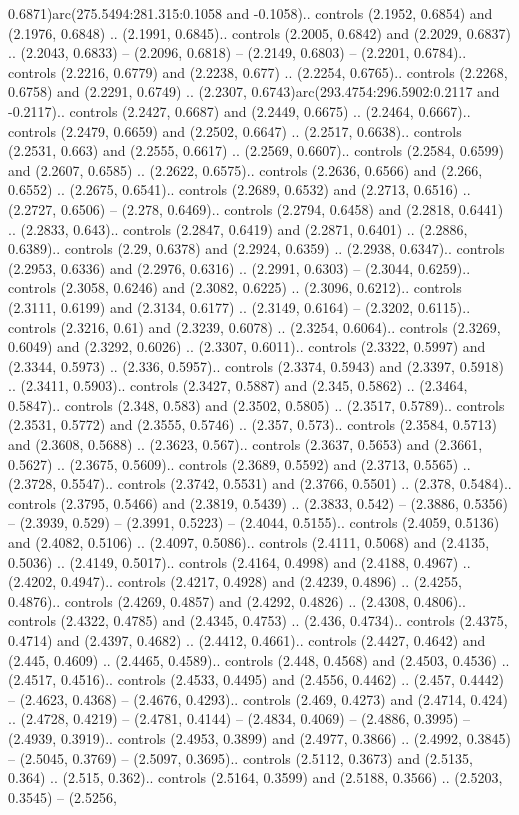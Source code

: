 0.6871)arc(275.5494:281.315:0.1058 and -0.1058).. controls (2.1952, 0.6854) and (2.1976, 0.6848) .. (2.1991, 0.6845).. controls (2.2005, 0.6842) and (2.2029, 0.6837) .. (2.2043, 0.6833) -- (2.2096, 0.6818) -- (2.2149, 0.6803) -- (2.2201, 0.6784).. controls (2.2216, 0.6779) and (2.2238, 0.677) .. (2.2254, 0.6765).. controls (2.2268, 0.6758) and (2.2291, 0.6749) .. (2.2307, 0.6743)arc(293.4754:296.5902:0.2117 and -0.2117).. controls (2.2427, 0.6687) and (2.2449, 0.6675) .. (2.2464, 0.6667).. controls (2.2479, 0.6659) and (2.2502, 0.6647) .. (2.2517, 0.6638).. controls (2.2531, 0.663) and (2.2555, 0.6617) .. (2.2569, 0.6607).. controls (2.2584, 0.6599) and (2.2607, 0.6585) .. (2.2622, 0.6575).. controls (2.2636, 0.6566) and (2.266, 0.6552) .. (2.2675, 0.6541).. controls (2.2689, 0.6532) and (2.2713, 0.6516) .. (2.2727, 0.6506) -- (2.278, 0.6469).. controls (2.2794, 0.6458) and (2.2818, 0.6441) .. (2.2833, 0.643).. controls (2.2847, 0.6419) and (2.2871, 0.6401) .. (2.2886, 0.6389).. controls (2.29, 0.6378) and (2.2924, 0.6359) .. (2.2938, 0.6347).. controls (2.2953, 0.6336) and (2.2976, 0.6316) .. (2.2991, 0.6303) -- (2.3044, 0.6259).. controls (2.3058, 0.6246) and (2.3082, 0.6225) .. (2.3096, 0.6212).. controls (2.3111, 0.6199) and (2.3134, 0.6177) .. (2.3149, 0.6164) -- (2.3202, 0.6115).. controls (2.3216, 0.61) and (2.3239, 0.6078) .. (2.3254, 0.6064).. controls (2.3269, 0.6049) and (2.3292, 0.6026) .. (2.3307, 0.6011).. controls (2.3322, 0.5997) and (2.3344, 0.5973) .. (2.336, 0.5957).. controls (2.3374, 0.5943) and (2.3397, 0.5918) .. (2.3411, 0.5903).. controls (2.3427, 0.5887) and (2.345, 0.5862) .. (2.3464, 0.5847).. controls (2.348, 0.583) and (2.3502, 0.5805) .. (2.3517, 0.5789).. controls (2.3531, 0.5772) and (2.3555, 0.5746) .. (2.357, 0.573).. controls (2.3584, 0.5713) and (2.3608, 0.5688) .. (2.3623, 0.567).. controls (2.3637, 0.5653) and (2.3661, 0.5627) .. (2.3675, 0.5609).. controls (2.3689, 0.5592) and (2.3713, 0.5565) .. (2.3728, 0.5547).. controls (2.3742, 0.5531) and (2.3766, 0.5501) .. (2.378, 0.5484).. controls (2.3795, 0.5466) and (2.3819, 0.5439) .. (2.3833, 0.542) -- (2.3886, 0.5356) -- (2.3939, 0.529) -- (2.3991, 0.5223) -- (2.4044, 0.5155).. controls (2.4059, 0.5136) and (2.4082, 0.5106) .. (2.4097, 0.5086).. controls (2.4111, 0.5068) and (2.4135, 0.5036) .. (2.4149, 0.5017).. controls (2.4164, 0.4998) and (2.4188, 0.4967) .. (2.4202, 0.4947).. controls (2.4217, 0.4928) and (2.4239, 0.4896) .. (2.4255, 0.4876).. controls (2.4269, 0.4857) and (2.4292, 0.4826) .. (2.4308, 0.4806).. controls (2.4322, 0.4785) and (2.4345, 0.4753) .. (2.436, 0.4734).. controls (2.4375, 0.4714) and (2.4397, 0.4682) .. (2.4412, 0.4661).. controls (2.4427, 0.4642) and (2.445, 0.4609) .. (2.4465, 0.4589).. controls (2.448, 0.4568) and (2.4503, 0.4536) .. (2.4517, 0.4516).. controls (2.4533, 0.4495) and (2.4556, 0.4462) .. (2.457, 0.4442) -- (2.4623, 0.4368) -- (2.4676, 0.4293).. controls (2.469, 0.4273) and (2.4714, 0.424) .. (2.4728, 0.4219) -- (2.4781, 0.4144) -- (2.4834, 0.4069) -- (2.4886, 0.3995) -- (2.4939, 0.3919).. controls (2.4953, 0.3899) and (2.4977, 0.3866) .. (2.4992, 0.3845) -- (2.5045, 0.3769) -- (2.5097, 0.3695).. controls (2.5112, 0.3673) and (2.5135, 0.364) .. (2.515, 0.362).. controls (2.5164, 0.3599) and (2.5188, 0.3566) .. (2.5203, 0.3545) -- (2.5256, 